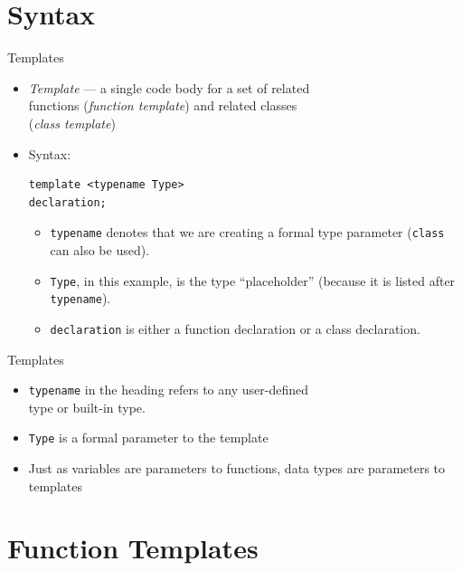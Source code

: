 \documentclass[14pt,aspectratio=1610, hyperref={pdfpagelayout=SinglePage}]{beamer}
\begin{document}
\section{Syntax}

\begin{frame}[fragile]{Templates}
\protect\hypertarget{templates-1-of-2}{}
\begin{itemize}
\item
  \emph{Template} --- a single code body for a set of related\\ functions
  (\emph{function template}) and related classes\\ (\emph{class template})
\item
  Syntax:
\begin{lstlisting}
template <typename Type>
declaration;
\end{lstlisting}
  \begin{itemize}
  \item
    \lstinline{typename} denotes that we are creating a formal type parameter
    (\lstinline{class} can also be used).
  \item
    \lstinline{Type}, in this example, is the type ``placeholder'' (because it is listed after
    \lstinline{typename}).
  \item
    \lstinline{declaration} is either a function declaration or a class
    declaration.
  \end{itemize}
\end{itemize}
\end{frame}

\begin{frame}[fragile]{Templates}
\protect\hypertarget{templates-2-of-2}{}
\begin{itemize}
\item
  \lstinline{typename} in the heading refers to any user-defined\\ type or
  built-in type.
\item
  \lstinline{Type} is a formal parameter to the template
\item
  Just as variables are parameters to functions, data types are
  parameters to templates
\end{itemize}
\end{frame}

\section{Function Templates}
\end{document}
